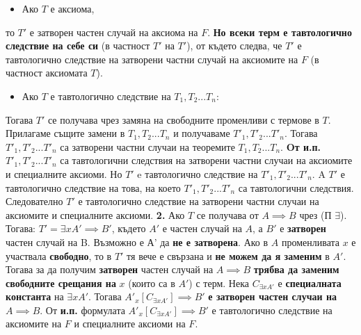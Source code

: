 \documentclass[french]{article}
\begin{document}
\begin{itemize}
\item Ако $T$ е аксиома,
\end{itemize}
 то $T'$ е затворен частен случай на аксиома на $F$. \newline \textbf{Но всеки терм е тавтологично следствие на себе си} (в частност $T'$ на $T'$), от където следва, че $T'$ е тавтологично следствие на затворени частни случай на аксиомите на $F$ (в частност аксиомата $T$).
 \begin{itemize}
\item Ако $T$ е тавтологично следствие на $T_1, T_2 ... T_n$:
\end{itemize}
Тогава $T'$ се получава чрез замяна на свободните променливи с термове в $T$. Прилагаме същите замени в $T_1, T_2 ... T_n$ и получаваме  $T'_1, T'_2 ... T'_n$. Тогава $T'_1, T'_2 ... T'_n$ са затворени частни случаи на теоремите $T_1, T_2 ... T_n$. \newline \textbf{Oт и.п.} $T'_1, T'_2 ... T'_n$ са тавтологични следствия на затворени частни случаи на аксиомите и специалните аксиоми. Но $T'$ e тавтологично следствие на $T'_1, T'_2 ... T'_n$. A  $T'$ е тавтологично следствие на това, на което $T'_1, T'_2 ... T'_n$ са тавтологични следствия. \newline Следователно $T'$ е тавтологично следствие на затворени частни случаи на аксиомите и специалните аксиоми. 
\newline\newline
	\textbf{2.} Ако $T$ се получава от $A \implies B$ чрез (П $\exists$).
\newline 
	Тогава: $T' = \exists x A' \implies B'$, където $A'$ е частен случай на $A$, а $B'$ е \textbf{затворен} частен случай на B.\newline
	Възможно е А' да \textbf{не е затворена}. Ако в $A$ променливата $x$ е участвала \textbf{свободно}, то в $T'$ тя вече е свързана и \textbf{не можем да я заменим} в $A'$. \newline
	Тогава за да получим \textbf{затворен} частен случай на  $A \implies B$ \textbf{трябва да заменим свободните срещания на } $x$ (които са в $A'$) с терм. \newline
	Нека $C_{\exists x A'}$ е \textbf{специалната константа} на $\exists x A'$. \newline
	Тогава $A'_{x}[C_{\exists x A'}] \implies B'$ \textbf{е затворен частен случаи на} $A \implies B$.
	От \textbf{и.п.} формулата $A'_{x}[C_{\exists x A'}] \implies B'$ е тавтологично следствие на аксиомите на $F$ и специалните аксиоми на $F$. \newline
\end{document}
